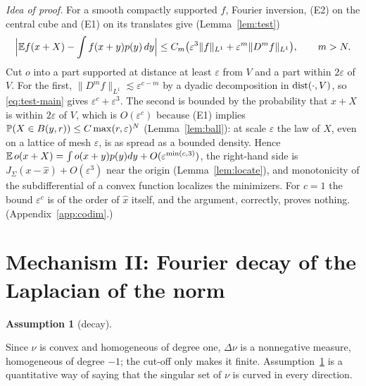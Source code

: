 \documentclass[anon,12pt]{colt2026}
\newtheorem{assumption}{Assumption}
\begin{document}
\noindent\emph{Idea of proof.} For a smooth compactly supported $f$, Fourier inversion, \textup{(E2)} on the central cube
and \textup{(E1)} on its translates give (Lemma~\ref{lem:test})
\begin{equation}\label{eq:test-main}
\Big|\mathbb{E} f(x+X)-\int f(x+y)p(y)\,dy\Big|\le C_m\big(\varepsilon^3\|f\|_{L^1}+\varepsilon^m\|D^mf\|_{L^1}\big),\qquad m>N.
\end{equation}
Cut $o$ into a part supported at distance at least $\varepsilon$ from $V$ and a part within $2\varepsilon$ of $V$. For
the first, $\|D^mf\|_{L^1}\lesssim\varepsilon^{c-m}$ by a dyadic decomposition in $\operatorname{dist}(\cdot,V)$, so \eqref{eq:test-main}
gives $\varepsilon^c+\varepsilon^3$. The second is bounded by the probability that $x+X$ is within $2\varepsilon$ of
$V$, which is $O(\varepsilon^c)$ because \textup{(E1)} implies $\mathbb{P}(X\in B(y,r))\le C\max(r,\varepsilon)^N$
(Lemma~\ref{lem:ball}): at scale $\varepsilon$ the law of $X$, even on a lattice of mesh $\varepsilon$, is as spread as a
bounded density. Hence $\mathbb{E}\,o(x+X)=\int o(x+y)p(y)dy+O(\varepsilon^{\min(c,3)})$, the right-hand side is
$J_\Sigma(x-\hat x)+O(\varepsilon^3)$ near the origin (Lemma~\ref{lem:locate}), and monotonicity of the subdifferential
of a convex function localizes the minimizers. For $c=1$ the bound $\varepsilon^{c}$ is of the order of $\hat x$ itself,
and the argument, correctly, proves nothing. (Appendix~\ref{app:codim}.)

\section{Mechanism II: Fourier decay of the Laplacian of the norm}\label{sec:laplace}

\begin{assumption}[decay]\label{ass:L}\StmtAssL\end{assumption}

Since $\nu$ is convex and homogeneous of degree one, $\Delta\nu$ is a nonnegative measure, homogeneous of degree
$-1$; the cut-off only makes it finite. Assumption~\ref{ass:L} is a quantitative way of saying that the singular set of
$\nu$ is curved in every direction.

\begin{theorem}\label{thm:laplace}\StmtLaplace\end{theorem}
\end{document}
